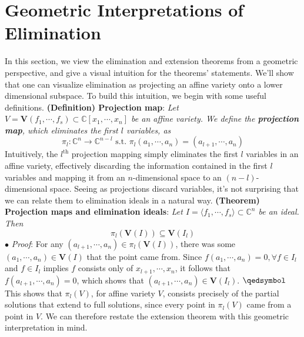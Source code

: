 \documentclass{article}
\begin{document}
\section{Geometric Interpretations of Elimination}
In this section, we view the elimination and extension theorems from a geometric perspective, and give a visual intuition for the theorems' statements. We'll show that one can visualize elimination as projecting an affine variety onto a lower dimensional subspace. To build this intuition, we begin with some useful definitions.
\newline \newline
\textbf{(Definition) Projection map}: \textit{Let $ V = \mathbf{V}(f_1, \cdots, f_s) \subset \mathbb{C}[x_1, \cdots, x_n] $ be an affine variety. We define the \textbf{projection map}, which eliminates the first $ l $ variables, as}
$$ \pi_l: \mathbb{C}^n \rightarrow \mathbb{C}^{n - l} \text{ s.t. } \pi_l(a_1, \cdots, a_n) = (a_{l + 1}, \cdots, a_n) $$
\newline \newline
Intuitively, the $ l^{\text{th}} $ projection mapping simply eliminates the first $ l $ variables in an affine variety, effectively discarding the information contained in the first $ l $ variables and mapping it from an $ n $-dimensional space to an $ (n - l) $-dimensional space. Seeing as projections discard variables, it's not surprising that we can relate them to elimination ideals in a natural way.
\newline \newline
\textbf{(Theorem) Projection maps and elimination ideals}: \textit{Let $ I = \langle f_1, \cdots, f_s \rangle \subset \mathbb{C}^n $ be an ideal. Then}
$$ \pi_l(\mathbf{V}(I)) \subseteq \mathbf{V}(I_l) $$
\indent $ \bullet $ \textit{Proof}: For any $ (a_{l + 1}, \cdots, a_n) \in \pi_l(\mathbf{V}(I)) $, there was some $ (a_1, \cdots, a_n) \in \mathbf{V}(I) $ that the point came from. Since $ f(a_1, \cdots, a_n) = 0, \forall f \in I_l $ and $ f \in I_l $ implies $ f $ consists only of $ x_{l + 1}, \cdots, x_n $, it follows that $ f(a_{l + 1}, \cdots, a_n) = 0 $, which shows that $ (a_{l + 1}, \cdots, a_n) \in \mathbf{V}(I_l) $. $ \qedsymbol $
\newline \newline
This shows that $ \pi_l(V) $, for affine variety $ V $, consists precisely of the partial solutions that extend to full solutions, since every point in $ \pi_l(V) $ came from a point in $ V $. We can therefore restate the extension theorem with this geometric interpretation in mind.
\end{document}
